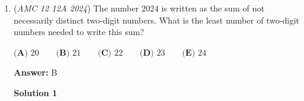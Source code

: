\begin{enumerate}
 $\textbf{(A) }240\qquad\textbf{(B) }246\qquad\textbf{(C) }252\qquad\textbf{(D) }258\qquad\textbf{(E) }264$

 \textbf{Answer: }B



\textbf{Solution 1}

Plug in the values into the equation to give you the following two equations:\begin{align*}69&=1.5a+800b, \\69&=1.2a+1100b.\end{align*}
Solving for the values $a$ and $b$ gives you that $a=30$ and $b=\frac{3}{100}$. These values can be plugged back in showing that these values are correct.Now, using the given length of the trail, $4.2$, and the given vertical increase, $4000$ , we get a final answer of $\boxed{\textbf{(B) }246}.$

 Solution by \href{https://artofproblemsolving.com/wiki/index.php?title=User:Juwushu}{juwushu}.

 Minor edits by ParticlePhysics and TigerSenju

 



\textbf{Solution 2}

Alternatively, observe that using $a=10x$ and $b=\frac{y}{100}$ makes the numbers much closer to each other in terms of magnitude.

 Plugging in the new variables:\begin{align*}69&=15x+8y, \\69&=12x+11y.\end{align*}


 The solution becomes more obvious in this way, with $15+8=12+11=23$, and since $23\cdot 3=69$, we determine that $x=y=3$.

 The question asks us for $4.2a+4000b=42x+40y$. Since $x=y$, we have $(40+42)\cdot 3=\boxed{\textbf{(B) }246}$.

 


	\item (\textit{AMC 12 12A 2024}) The number $2024$ is written as the sum of not necessarily distinct two-digit numbers. What is the least number of two-digit numbers needed to write this sum?


 $\textbf{(A) }20\qquad\textbf{(B) }21\qquad\textbf{(C) }22\qquad\textbf{(D) }23\qquad\textbf{(E) }24$

 \textbf{Answer: }B



\textbf{Solution 1}


\end{enumerate}

